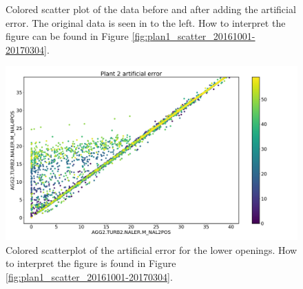 \begin{figure}
\begin{minipage}[b]{0.5\linewidth}
            \end{minipage}
            \caption{Colored scatter plot of the data before and after adding the artificial error. The original data is seen in to the left. How to interpret the figure can be found in Figure \ref{fig:plan1_scatter_20161001-20170304}.}
            \label{fig:plant2_arti_error}
        \end{figure}
        
        \begin{figure}
            \centering
            \includegraphics[width = \textwidth]{report/figures/analysis/artificial error/plant2_artificial_error_scatter_colored_40.png}
            \caption{Colored scatterplot of the artificial error for the lower openings. How to interpret the figure is found in Figure \ref{fig:plan1_scatter_20161001-20170304}.}
            \label{fig:plant2_arti_error_40}
        \end{figure}